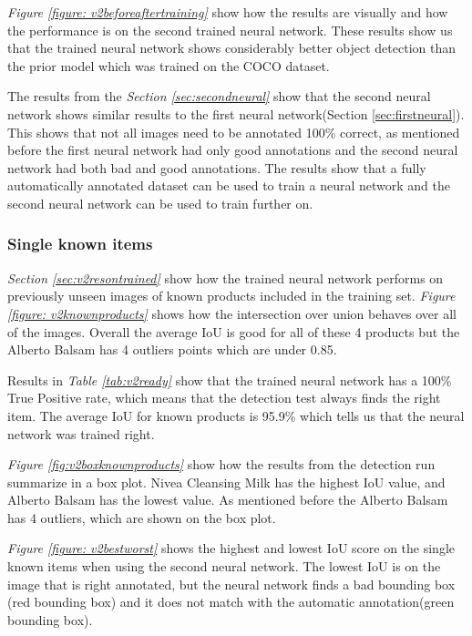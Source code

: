 \textit{Figure \ref{figure: v2beforeaftertraining}} show how the results are visually and how the performance is on the second trained neural network. These results show us that the trained neural network shows considerably better object detection than the prior model which was trained on the COCO dataset. 

The results from the \textit{Section \ref{sec:secondneural}} show that the second neural network shows similar results to the first neural network({Section \ref{sec:firstneural}}). This shows that not all images need to be annotated 100\% correct, as mentioned before the first neural network had only good annotations and the second neural network had both bad and good annotations. The results show that a fully automatically annotated dataset can be used to train a neural network and the second neural network can be used to train further on.


\subsubsection{Single known items}
\textit{Section \ref{sec:v2resontrained}} show how the trained neural network performs on previously unseen images of known products included in the training set. \textit{Figure \ref{figure: v2knownproducts}} shows how the intersection over union behaves over all of the images. Overall the average IoU is good for all of these 4 products but the Alberto Balsam has 4 outliers points which are under 0.85.%

Results in \textit{Table \ref{tab:v2ready}} show that the trained neural network has a 100\% True Positive rate, which means that the detection test always finds the right item. The average IoU for known products is 95.9\% which tells us that the neural network was trained right.

\textit{Figure \ref{fig:v2boxknownproducts}} show how the results from the detection run summarize in a box plot. Nivea Cleansing Milk has the highest IoU value, and Alberto Balsam has the lowest value. As mentioned before the Alberto Balsam has 4 outliers, which are shown on the box plot.

\textit{Figure \ref{figure: v2bestworst}} shows the highest and lowest IoU score on the single known items when using the second neural network. The lowest IoU is on the image that is right annotated, but the neural network finds a bad bounding box (red bounding box) and it does not match with the automatic annotation(green bounding box).


